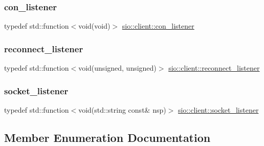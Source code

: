 \mbox{\label{classsio_1_1client_a23951b626c91c87e866d4e966ec828fa}} 
\subsubsection{\texorpdfstring{con\+\_\+listener}{con\_listener}}
{\footnotesize\ttfamily typedef std\+::function$<$void(void)$>$ \hyperlink{classsio_1_1client_a23951b626c91c87e866d4e966ec828fa}{sio\+::client\+::con\+\_\+listener}}

\mbox{\label{classsio_1_1client_a62a35170a39347cb1e56e2105badcad1}} 
\subsubsection{\texorpdfstring{reconnect\+\_\+listener}{reconnect\_listener}}
{\footnotesize\ttfamily typedef std\+::function$<$void(unsigned, unsigned)$>$ \hyperlink{classsio_1_1client_a62a35170a39347cb1e56e2105badcad1}{sio\+::client\+::reconnect\+\_\+listener}}

\mbox{\label{classsio_1_1client_a02b43cadd1588575ae2465042452cabf}} 
\subsubsection{\texorpdfstring{socket\+\_\+listener}{socket\_listener}}
{\footnotesize\ttfamily typedef std\+::function$<$void(std\+::string const\& nsp)$>$ \hyperlink{classsio_1_1client_a02b43cadd1588575ae2465042452cabf}{sio\+::client\+::socket\+\_\+listener}}



\subsection{Member Enumeration Documentation}
\mbox{\label{classsio_1_1client_a5c8b6c424134f40b3e9bf488b4961aaf}} 
